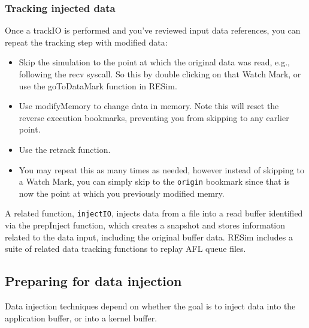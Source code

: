 \documentclass[titlepage]{article}
\begin{document}
\subsubsection{Tracking injected data}
Once a trackIO is performed and you've reviewed input data references, you can repeat the tracking step with modified data:
\begin{itemize}
\item Skip the simulation to the point at which the original data was read, e.g., following the recv syscall.  So this by double clicking
on that Watch Mark, or use the goToDataMark function in RESim.
\item Use modifyMemory to change data in memory.  Note this will reset the reverse execution bookmarks, preventing you from skipping to
any earlier point.
\item Use the retrack function.
\item You may repeat this as many times as needed, however instead of skipping to a Watch Mark, you can simply skip to the {\tt origin}
bookmark since that is now the point at which you previously modified memry.
\end{itemize}

A related function,  {\tt injectIO}, injects data from a file into a read buffer identified via the prepInject function, which creates a snapshot
and stores information related to the data input, including the original buffer data.
RESim includes a suite of related data tracking functions to replay AFL queue files.

\subsection{Preparing for data injection}
\label{prepInject}
Data injection techniques depend on whether the goal is to inject data into the application buffer, or into a kernel buffer.
\end{document}
